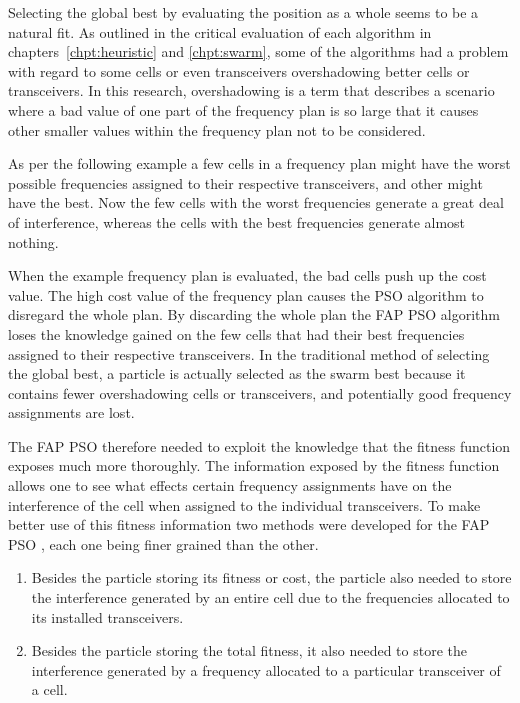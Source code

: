 Selecting the global best by evaluating the position as a whole seems to be a natural fit. As outlined in the critical evaluation of each algorithm in chapters~\ref{chpt:heuristic} and \ref{chpt:swarm}, some of the algorithms had a problem with regard to some cells or even transceivers overshadowing better cells or transceivers. In this research, overshadowing is a term that describes a scenario where a bad value of one part of the frequency plan is so large that it causes other smaller values within the frequency plan not to be considered. 

As per the following example a few cells in a frequency plan might have the worst possible frequencies assigned to their respective transceivers, and other might have the best. Now the few cells with the worst frequencies generate a great deal of interference, whereas the cells with the best frequencies generate almost nothing.

When the example frequency plan is evaluated, the bad cells push up the cost value. The high cost value of the frequency plan causes the \gls{PSO} algorithm to disregard the whole plan. By discarding the whole plan the \gls{FAP} \gls{PSO} algorithm loses the knowledge gained on the few cells that had their best frequencies assigned to their respective transceivers. In the traditional method of selecting the global best, a particle is actually selected as the swarm best because it contains fewer overshadowing cells or transceivers, and potentially good frequency assignments are lost.

The \gls{FAP} \gls{PSO} therefore needed to exploit the knowledge that the fitness function exposes much more thoroughly. The information exposed by the fitness function allows one to see what effects certain frequency assignments have on the interference of the cell when assigned to the individual transceivers. To make better use of this fitness information two methods were developed for the \gls{FAP} \gls{PSO} , each one being finer grained than the other.

\begin{enumerate}
\item Besides the particle storing its fitness or cost, the particle also needed to store the interference generated by an entire cell due to the frequencies allocated to its installed transceivers.
\item Besides the particle storing the total fitness, it also needed to store the interference generated by a frequency allocated to a particular transceiver of a cell.
\end{enumerate}

